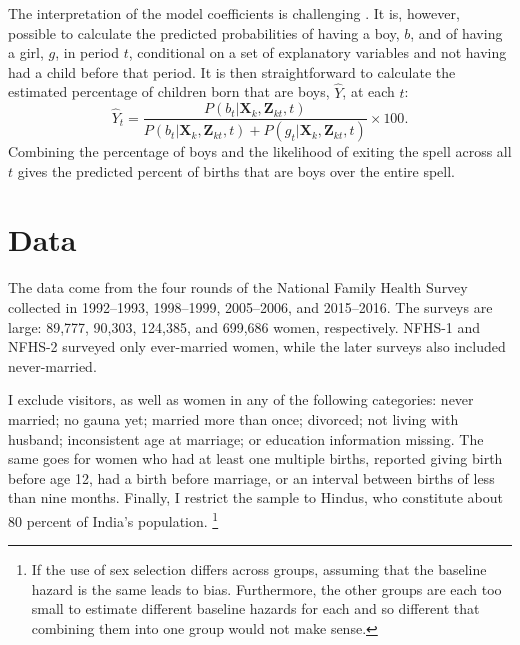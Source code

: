 \documentclass[12pt,letterpaper]{article}
\begin{document}
The interpretation of the model coefficients is challenging \citep{thomas96}.
It is, however, possible to calculate the predicted probabilities of 
having a boy, $b$, and of having a girl, $g$, in period $t$, conditional on 
a set of explanatory variables and not having had a child before that period.
It is then straightforward to calculate the estimated percentage of children born that 
are boys, $\hat{Y}$, at each $t$:  
\begin{equation}
\hat{Y}_t 
= 
\frac{ P(b_{t} | \mathbf{X}_{k}, \mathbf{Z}_{kt},t )}
{ P(b_{t} | \mathbf{X}_{k}, \mathbf{Z}_{kt},t) + P(g_{t} | \mathbf{X}_{k}, \mathbf{Z}_{kt},t )} 
\times 100.
\label{eq:probability_son}
\end{equation}
Combining the percentage of boys and the likelihood of exiting the spell 
across all $t$ gives the predicted percent of births that are boys over the entire spell.


\section{Data\label{sec:data}}

The data come from the four rounds of the National Family Health Survey
collected in 1992--1993, 1998--1999, 2005--2006, and 2015--2016.
The surveys are large: 89,777, 90,303, 124,385, and 699,686 women,
respectively. NFHS-1 and NFHS-2 surveyed only ever-married women, while
the later surveys also included never-married.

I exclude visitors, as well as women in any of the following 
categories: never married; no gauna yet; married more than once; divorced; 
not living with husband; inconsistent age at marriage; or education information missing.  
The same goes for women who had at least one multiple births, reported giving birth 
before age 12, had a birth before marriage, or an interval between births of less than 
nine months. 
Finally, I restrict the sample to Hindus, who constitute about 80 percent of India’s 
population.%
\footnote{
If the use of sex selection differs across groups, assuming that the
baseline hazard is the same leads to bias. 
Furthermore, the other groups are each too small to estimate different
baseline hazards for each and so different that combining them into one
group would not make sense.
} 
\end{document}
